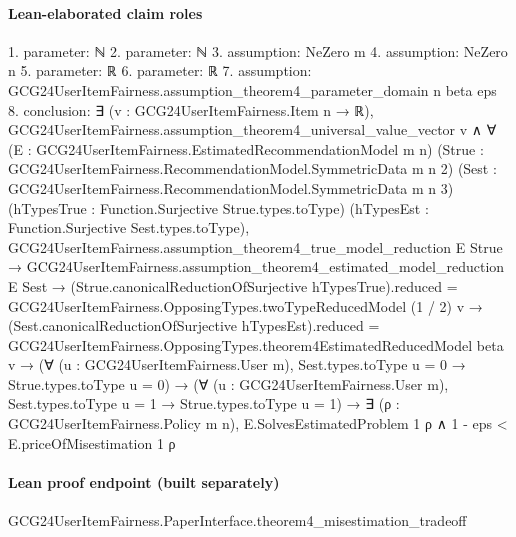 \documentclass[10pt]{article}
\begin{document}
\paragraph{Lean-elaborated claim roles}\begin{ReviewVerbatim}
1. parameter: ℕ
2. parameter: ℕ
3. assumption: NeZero m
4. assumption: NeZero n
5. parameter: ℝ
6. parameter: ℝ
7. assumption: GCG24UserItemFairness.assumption_theorem4_parameter_domain n beta eps
8. conclusion: ∃ (v : GCG24UserItemFairness.Item n → ℝ),
  GCG24UserItemFairness.assumption_theorem4_universal_value_vector v ∧
    ∀ (E : GCG24UserItemFairness.EstimatedRecommendationModel m n)
      (Strue : GCG24UserItemFairness.RecommendationModel.SymmetricData m n 2)
      (Sest : GCG24UserItemFairness.RecommendationModel.SymmetricData m n 3)
      (hTypesTrue : Function.Surjective Strue.types.toType) (hTypesEst : Function.Surjective Sest.types.toType),
      GCG24UserItemFairness.assumption_theorem4_true_model_reduction E Strue →
        GCG24UserItemFairness.assumption_theorem4_estimated_model_reduction E Sest →
          (Strue.canonicalReductionOfSurjective hTypesTrue).reduced =
              GCG24UserItemFairness.OpposingTypes.twoTypeReducedModel (1 / 2) v →
            (Sest.canonicalReductionOfSurjective hTypesEst).reduced =
                GCG24UserItemFairness.OpposingTypes.theorem4EstimatedReducedModel beta v →
              (∀ (u : GCG24UserItemFairness.User m), Sest.types.toType u = 0 → Strue.types.toType u = 0) →
                (∀ (u : GCG24UserItemFairness.User m), Sest.types.toType u = 1 → Strue.types.toType u = 1) →
                  ∃ (ρ : GCG24UserItemFairness.Policy m n),
                    E.SolvesEstimatedProblem 1 ρ ∧ 1 - eps < E.priceOfMisestimation 1 ρ
\end{ReviewVerbatim}

\paragraph{Lean proof endpoint (built separately)}\begin{ReviewVerbatim}
GCG24UserItemFairness.PaperInterface.theorem4_misestimation_tradeoff
\end{ReviewVerbatim}
\end{document}
